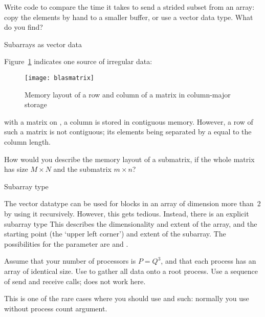 \begin{exercise}
  Write code to compare the time it takes to send a strided subset
  from an array: copy the elements by hand to a smaller buffer, or use
  a vector data type. What do you find?
\end{exercise}

 {Subarrays as vector data}

Figure~\ref{fig:blasmatrix} indicates one source of irregular
data:
%
\begin{figure}[ht]
  \texttt{[image: blasmatrix]}
  \caption{Memory layout of a row and column of a matrix in column-major storage}
  \label{fig:blasmatrix}
\end{figure}
%
with a matrix on , a column is
stored in contiguous memory. However, a row of such a matrix
is not contiguous; its elements being separated by a 
equal to the column length.

\begin{exercise}
  \label{ex:submatrix}
  How would you describe the memory layout of a submatrix,
  if the whole matrix has size $M\times N$ and the submatrix $m\times n$?
\end{exercise}

 {Subarray type}
\label{sec:type_subarray}

The vector datatype can be used for blocks in an array of dimension
more than~2 by using it recursively. However, this gets
tedious. Instead, there is an explicit subarray type
%
%
This describes the dimensionality and extent of the array, and
the starting point (the `upper left corner') and extent of the
subarray.
The possibilities for the  parameter are
 and .

\begin{exercise}
  \label{ex:cubegather}

  Assume that your number of processors is $P=Q^3$, and that each
  process has an array of identical size. Use
   to gather all data onto a root process.
  Use a sequence of send and receive calls;
   does not work here.

\begin{tacc}
This is one of the rare cases where you should use 
and such: normally you use  without process count argument.
\end{tacc}

\end{exercise}

